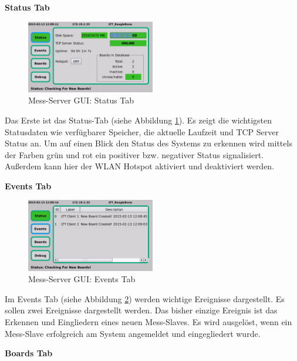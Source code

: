 \textbf{Status Tab}

\begin{figure}[H]
\begin{center}
\includegraphics[width=0.5\textwidth ]{img/GUI/Server_GUI_Status1.png}
\caption{Mess-Server GUI: Status Tab}
\label{figure_MessServerGUIStatus}
\end{center}
\end{figure}

Das Erste ist das Status-Tab (siehe Abbildung \ref{figure_MessServerGUIStatus}). Es zeigt die wichtigsten Statusdaten wie verfügbarer Speicher, die aktuelle Laufzeit und TCP Server Status an. Um auf einen Blick den Status des Systems zu erkennen wird mittels der Farben grün und rot ein positiver bzw. negativer Status signalisiert. Außerdem kann hier der WLAN Hotspot aktiviert und deaktiviert werden.

\textbf{Events Tab}

\begin{figure}[H]
\begin{center}
\includegraphics[width=0.5\textwidth ]{img/GUI/Server_GUI_Events1.png}
\caption{Mess-Server GUI: Events Tab}
\label{figure_MessServerGUIEvents}
\end{center}
\end{figure}

Im Events Tab (siehe Abbildung \ref{figure_MessServerGUIEvents}) werden wichtige Ereignisse dargestellt. Es sollen zwei Ereignisse dargestellt werden. Das bisher einzige Ereignis ist das Erkennen und Eingliedern eines neuen Mess-Slaves. Es wird ausgelöst, wenn ein Mess-Slave erfolgreich am System angemeldet und eingegliedert wurde. 

\textbf{Boards Tab}

